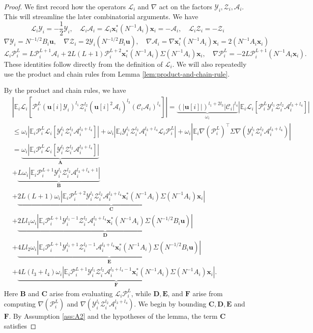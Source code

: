 \documentclass[10pt,a4paper]{amsart}
\def\E{\mathbb{E}}
\def\cA{\mathcal{A}}
\def\cC{\mathcal{C}}
\def\cL{\mathcal{L}}
\def\cP{\mathcal{P}}
\def\cY{\mathcal{Y}}
\def\cZ{\mathcal{Z}}
\def\u{\mathbf{u}}
\def\x{\mathbf{x}}
\begin{document}
\begin{proof}
We first record how the operators $\cL_i$ and $\nabla$ act on the factors $\cY_i,\cZ_i,\cA_i$. This will streamline the later combinatorial arguments. We have
\[
    \cL_i\cY_i=-\frac{1}{2}\cY_i,\quad \cL_i\cA_i=\cL_i\x_i^*(N^{-1}A_i)\x_i=-\cA_i,\quad \cL_i\cZ_i=-\cZ_i
\]
\[
    \nabla\cY_i=N^{-1/2}B_i\u,\quad \nabla\cZ_i=2\cY_i(N^{-1/2}B_i\u),\quad \nabla\cA_i=\nabla\x_i^*(N^{-1}A_i)\x_i=2(N^{-1}A_i\x_i)
\]
\[
    \cL_i\cP_i^L=L\cP_i^{L+1}\cA_i+2L(L+1)\cP_i^{L+2}\x_i^*(N^{-1}A_i)\Sigma(N^{-1}A_i)\x_i,\quad \nabla\cP_i^L=-2L\cP_i^{L+1}(N^{-1}A_i\x_i).
\]
These identities follow directly from the definition of $\cL_i$. We will also repeatedly use the product and chain rules from Lemma \ref{lem:product-and-chain-rule}.

By the product and chain rules, we have
\begin{align*}
    &|\E_i\cL_i[\cP_i^L(\u[i]\cY_i)^{l_1}\cZ_i^{l_2}(\u[i]^2\cA_i)^{l_3}(\cC_i\cA_i)^{l_4}]|=\underbrace{(|\u[i]|)^{l_1+2l_3}|\cC_i|^{l_4}}_{\omega_i}|\E_i\cL_i[\cP_i^L\cY_i^{l_1}\cZ_i^{l_2}\cA_i^{l_3+l_4}]|\\
    &\leq\omega_i|\E_i\cP_i^L\cL_i[\cY_i^{l_1}\cZ_i^{l_2}\cA_i^{l_3+l_4}]|+\omega_i|\E_i\cY_i^{l_1}\cZ_i^{l_2}\cA_i^{l_3+l_4}\cL_i\cP_i^L|+\omega_i|\E_i\nabla(\cP_i^L)^\top\Sigma\nabla(\cY_i^{l_1}\cZ_i^{l_2}\cA_i^{l_3+l_4})|\\
    &=\underbrace{\omega_i|\E_i\cP_i^L\cL_i[\cY_i^{l_1}\cZ_i^{l_2}\cA_i^{l_3+l_4}]|}_{\mathbf{A}}\\
    &+\underbrace{L\omega_i|\E_i\cP_i^{L+1}\cY_i^{l_1}\cZ_i^{l_2}\cA_i^{l_3+l_4+1}|}_\mathbf{B}\\
    &+\underbrace{2L(L+1)\omega_i|\E_i\cP_i^{L+2}\cY_i^{l_1}\cZ_i^{l_2}\cA_i^{l_3+l_4}\x_i^*(N^{-1}A_i)\Sigma(N^{-1}A_i)\x_i|}_{\mathbf{C}}\\
    &+\underbrace{2Ll_1\omega_i|\E_i\cP_i^{L+1}\cY_i^{l_1-1}\cZ_i^{l_2}\cA_i^{l_3+l_4}\x_i^*(N^{-1}A_i)\Sigma(N^{-1/2}B_i\u)|}_{\mathbf{D}}\\
    &+\underbrace{4Ll_2\omega_i|\E_i\cP_i^{L+1}\cY_i^{l_1+1}\cZ_i^{l_2-1}\cA_i^{l_3+l_4}\x_i^*(N^{-1}A_i)\Sigma(N^{-1/2}B_i\u)|}_{\mathbf{E}}\\
    &+\underbrace{4L(l_3+l_4)\omega_i|\E_i\cP_i^{L+1}\cY_i^{l_1}\cZ_i^{l_2}\cA_i^{l_3+l_4-1}\x_i^*(N^{-1}A_i)\Sigma(N^{-1}A_i)\x_i|}_{\mathbf{F}}.
\end{align*}
Here $\mathbf{B}$ and $\mathbf{C}$ arise from evaluating $\cL_i\cP_i^L$, while $\mathbf{D},\mathbf{E}$, and $\mathbf{F}$ arise from computing $\nabla(\cP_i^L)$ and $\nabla(\cY_i^{l_1}\cZ_i^{l_2}\cA_i^{l_3+l_4})$. We begin by bounding $\mathbf{C,D,E}$ and $\mathbf{F}$. By Assumption \ref{ass:A2} and the hypotheses of the lemma, the term $\mathbf{C}$ satisfies

\end{proof}
\end{document}
